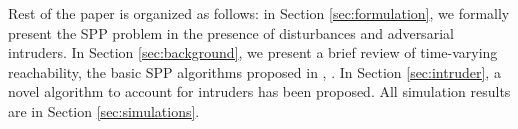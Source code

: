 Rest of the paper is organized as follows: in Section \ref{sec:formulation}, we formally present the SPP problem in the presence of disturbances and adversarial intruders. In Section \ref{sec:background}, we present a brief review of time-varying reachability, the basic SPP algorithms proposed in \cite{Chen15c}, \cite{Bansal2017}. In Section \ref{sec:intruder}, a novel algorithm to account for intruders has been proposed. All simulation results are in Section \ref{sec:simulations}. 